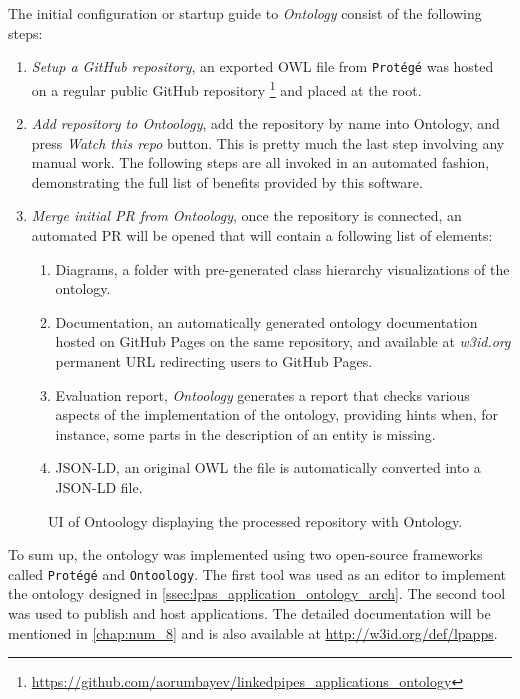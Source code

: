 The initial configuration or startup guide to \textit{Ontology} consist of the following steps: 
\begin{enumerate}
    \item \textit{Setup a GitHub repository}, an exported OWL file from \texttt{Protégé} was hosted on a regular public GitHub repository \footnote{\url{https://github.com/aorumbayev/linkedpipes_applications_ontology}} and placed at the root.
    \item \textit{Add repository to Ontoology}, add the repository by name into Ontology, and press \textit{Watch this repo} button. This is pretty much the last step involving any manual work. The following steps are all invoked in an automated fashion, demonstrating the full list of benefits provided by this software.
    \item \textit{Merge initial PR from Ontoology}, once the repository is connected, an automated PR will be opened that will contain a following list of elements:
    \begin{enumerate}
        \item Diagrams, a folder with pre-generated class hierarchy visualizations of the ontology.
        \item Documentation, an automatically generated ontology documentation hosted on GitHub Pages on the same repository, and available at \textit{w3id.org} permanent URL redirecting users to GitHub Pages.
        \item Evaluation report, \textit{Ontoology} generates a report that checks various aspects of the implementation of the ontology, providing hints when, for instance, some parts in the description of an entity is missing.
        \item JSON-LD, an original OWL the file is automatically converted into a JSON-LD file.  
    \end{enumerate}
\end{enumerate}

\begin{figure}[h]
\centering
{}
\caption{UI of Ontoology displaying the processed repository with \lpas{} Ontology.}
\label{fig:misc_ontoology_ui}
\end{figure}

To sum up, the \lpas{} ontology was implemented using two open-source frameworks called \texttt{Protégé} and \texttt{Ontoology}. The first tool was used as an editor to implement the ontology designed in \autoref{ssec:lpas_application_ontology_arch}. The second tool was used to publish and host applications. The detailed documentation will be mentioned in \autoref{chap:num_8} and is also available at \url{http://w3id.org/def/lpapps}. 


